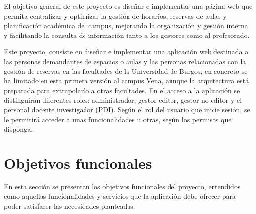 
El objetivo general de este proyecto es diseñar e implementar una página web que permita centralizar y optimizar la gestión de horarios, reservas de aulas y planificación académica del campus, mejorando la organización y gestión interna y facilitando la consulta de información tanto a los gestores como al profesorado.


Este proyecto, consiste en diseñar e implementar una aplicación web destinada a las personas demandantes de espacios o aulas y las personas relacionadas con la gestión de reservas en las facultades de la Universidad de Burgos, en concreto se ha limitado en esta primera versión al campus Vena, aunque la arquitectura está preparada para extrapolarlo a otras facultades. En el acceso a la aplicación se distinguirán diferentes roles: administrador, gestor editor, gestor no editor y el personal docente investigador (PDI). Según el rol del usuario que inicie sesión, se le permitirá acceder a unas funcionalidades u otras, según los permisos que disponga.

\section{Objetivos funcionales}

En esta sección se presentan los objetivos funcionales del proyecto, entendidos como aquellas funcionalidades y servicios que la aplicación debe ofrecer para poder satisfacer las necesidades planteadas.

